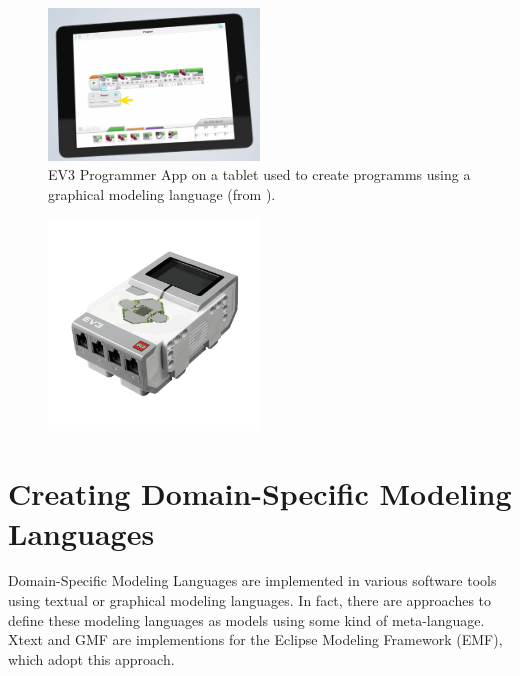 \documentclass[runningheads,a4paper]{llncs}
\begin{document}
    \begin{figure}[H]
	  \centering
    \includegraphics[width=0.5\textwidth]{images/mindstorms0.PNG}
	  \caption{EV3 Programmer App on a tablet used to create programms using a graphical modeling language (from \cite{legoev3}).}
	  \label{fig:ev3app}
    \end{figure}


      \begin{figure}[H]
	        \centering
      \includegraphics[width=0.5\textwidth]{images/ev3brick.png}
	    \label{fig:ev3pbrick}
      \end{figure}



    \section{Creating Domain-Specific Modeling Languages}
    \label{section:creatingdsmls}
    Domain-Specific Modeling Languages are implemented in various software tools using textual or graphical modeling languages.
    In fact, there are approaches to define these modeling languages as models using some kind of meta-language.
    Xtext and GMF are implementions for the Eclipse Modeling Framework (EMF), which adopt this approach.
    
\end{document}
